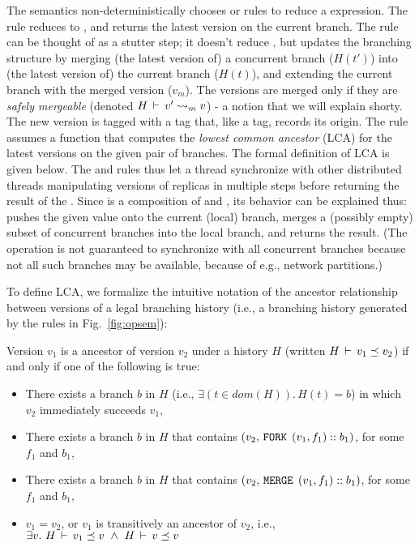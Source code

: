 The semantics non-deterministically chooses  or
 rules to reduce a  expression. The
 rule reduces  to \C{()}, and returns the
latest version on the current branch. The  rule
can be thought of as a stutter step; it doesn't reduce , but
updates the branching structure by merging (the latest version of) a
concurrent branch ($H(t')$) into (the latest version of) the current
branch ($H(t)$), and extending the current branch with the merged
version ($v_m$). The versions are merged only if they are \emph{safely
mergeable} (denoted $H\,\vdash\,v' \rightsquigarrow_m v$) - a notion that we will
explain shorty. The new version is tagged with a  tag that,
like a  tag, records its origin. The rule assumes a function
 that computes the \emph{lowest common ancestor} (LCA) for the
latest versions on the given pair of branches. The formal definition
of LCA is given below. The  and
 rules thus let a thread synchronize with other
distributed threads manipulating versions of replicas in multiple
steps before returning the result of the . Since  is a
composition of  and , its behavior can be explained
thus:  pushes the given value onto the current (local) branch,
merges a (possibly empty) subset of concurrent branches into the local
branch, and returns the result.  (The operation is not guaranteed to
synchronize with all concurrent branches because not all such branches
may be available, because of e.g., network partitions.)

To define LCA, we formalize the intuitive notation of the ancestor
relationship between versions of a legal branching history (i.e., a
branching history generated by the rules in Fig.~\ref{fig:opsem}):

\begin{definition} 
Version $v_1$ is a ancestor of version $v_2$ under a history
$H$ (written $H\,\vdash\,v_1 \preceq v_2$) if and only if one of the
following is true:
\begin{itemize}
  \item There exists a branch $b$ in $H$ (i.e., $\exists(t\in
  dom(H)).\,H(t) = b$) in which $v_2$ immediately succeeds
  $v_1$,
  \item There exists a branch $b$ in $H$ that contains $(v_2,
  \,{\tt FORK}\,\; (v_1,f_1)::b_1)$, for some $f_1$ and $b_1$,
  \item There exists a branch $b$ in $H$ that contains
  $(v_2, \,{\tt MERGE}\,\;(v_1,f_1)::b_1)$, for some $f_1$ and $b_1$,
  \item $v_1 = v_2$, or $v_1$ is transitively an ancestor of
  $v_2$, i.e., $\exists v.~ H\,\vdash\,v_1 \preceq v ~\wedge~
  H\,\vdash\,v \preceq v$
\end{itemize}
\end{definition}

